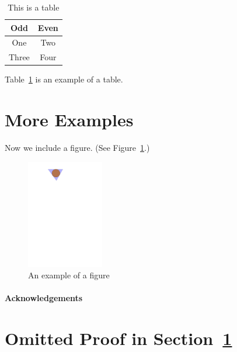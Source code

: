\documentclass[a4paper]{article}
\theoremstyle{plain}
\theoremstyle{definition}
\begin{document}
\begin{table}[ht]
	\centering
	\begin{tabular}{|c|c|}
		\hline
		\textbf{Odd} & \textbf{Even} \\
		\hline\hline
		One          & Two           \\
		\hline
		Three        & Four          \\
		\hline
	\end{tabular}
	\caption{This is a table}
	\label{tbl:1}
\end{table}

Table~\ref*{tbl:1} is an example of a table.

\section{More Examples}
\label{sec:examples}

Now we include a figure.
(See Figure~\ref{fig:example}.)
\begin{figure}[ht]
	\centering
	\includegraphics[width=0.3\textwidth]{example}
	\caption{An example of a figure}
	\label{fig:example}
\end{figure}

\paragraph{Acknowledgements} \lipsum[6]


% 

\printbibliography

\appendix

\section{Omitted Proof in Section~\ref{sec:examples}}
\label{app:1}

\lipsum[7]
\end{document}
